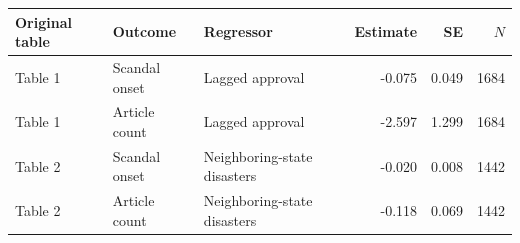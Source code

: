 \begin{tabular}{lllrrr}
\toprule
Original table & Outcome & Regressor & Estimate & SE & $N$ \\
\midrule
Table 1 & Scandal onset & Lagged approval & -0.075 & 0.049 & 1684 \\
Table 1 & Article count & Lagged approval & -2.597 & 1.299 & 1684 \\
Table 2 & Scandal onset & Neighboring-state disasters & -0.020 & 0.008 & 1442 \\
Table 2 & Article count & Neighboring-state disasters & -0.118 & 0.069 & 1442 \\
\bottomrule
\end{tabular}
